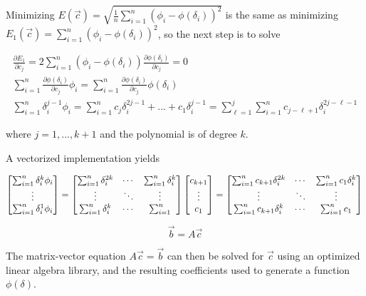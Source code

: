 Minimizing $E(\vec{c})=\sqrt{\frac{1}{n}\sum_{i=1}^n(\phi_i-\phi(\delta_i))^2}$ is the same as minimizing $E_1(\vec{c})=\sum_{i=1}^n(\phi_i-\phi(\delta_i))^2$, so the next step is to solve

\begin{gather}
    \frac{\partial E_1}{\partial c_j}=2\sum_{i=1}^n(\phi_i-\phi(\delta_i)) \frac{\partial \phi(\delta_i)}{\partial c_j}=0\\
    \sum_{i=1}^n\frac{\partial \phi(\delta_i)}{\partial c_j}\phi_i=\sum_{i=1}^n\frac{\partial \phi(\delta_i)}{\partial c_j}\phi(\delta_i)\\
    \sum_{i=1}^n \delta_i^{j-1}\phi_i=\sum_{i=1}^n c_j\delta_i^{2j-1}+\ldots+c_1\delta_i^{j-1}=\sum_{\ell=1}^j\sum_{i=1}^n c_{j-\ell+1}\delta_i^{2j-\ell-1}
\end{gather}

where $j=1,\ldots,k+1$ and the polynomial is of degree $k$.

A vectorized implementation yields

\begin{equation}
    \begin{bmatrix}\sum_{i=1}^n \delta_i^k\phi_i\\\vdots\\\sum_{i=1}^n \delta_i^1\phi_i\end{bmatrix}
    =\begin{bmatrix}\sum_{i=1}^n\delta_i^{2k}&\cdots&\sum_{i=1}^n\delta_i^{k}\\\vdots&\ddots&\vdots\\\sum_{i=1}^n \delta_i^{k}&\cdots&\sum_{i=1}^n\end{bmatrix}
    \begin{bmatrix}c_{k+1}\\\vdots\\c_1\end{bmatrix}
    =\begin{bmatrix}\sum_{i=1}^nc_{k+1}\delta_i^{2k}&\cdots&\sum_{i=1}^nc_1\delta_i^{k}\\\vdots&\ddots&\vdots\\\sum_{i=1}^n c_{k+1}\delta_i^{k}&\cdots&\sum_{i=1}^nc_1\end{bmatrix}\\
\end{equation}

\begin{equation}
    \vec{b}=A\vec{c}
\end{equation}

The matrix-vector equation $A\vec{c}=\vec{b}$ can then be solved for $\vec{c}$ using an optimized linear algebra library, and the resulting coefficients used to generate a function $\phi(\delta)$.
